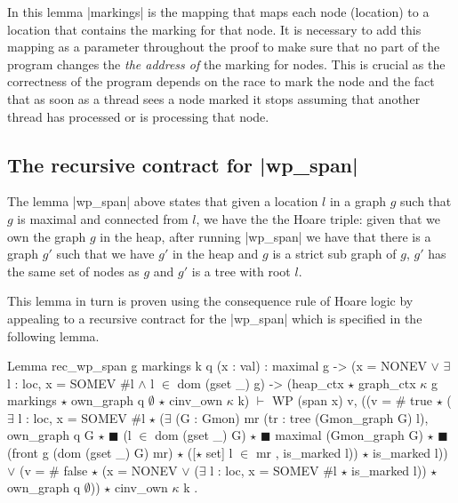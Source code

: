 \documentclass[]{scrartcl}
\begin{document}
In this lemma \Coqe|markings| is the mapping that maps each node (location) to a location that contains the marking for that node.
It is necessary to add this mapping as a parameter throughout the
proof to make sure that no part of the program changes the
\emph{the address of} the marking for nodes.
This is crucial as the correctness of the program depends on the
race to mark the node and the fact that as soon as a thread sees
a node marked it stops assuming that another thread has processed or is
processing that node.

\subsection{The recursive contract for \Coqe|wp_span|}
The lemma \Coqe|wp_span| above states that given a location $l$ in a graph $g$
such that $g$ is maximal and connected from $l$, we have the the Hoare triple:
given that we own the graph $g$ in the heap, after running \Coqe|wp_span| we have
that there is a graph $g'$ such that we have $g'$ in the heap and $g$ is a strict sub graph of $g$, $g'$ has the same set of nodes as $g$ and $g'$ is a tree with root $l$.

This lemma in turn is proven using the consequence rule of Hoare logic 
by appealing to a recursive contract for the \Coqe|wp_span| which is
specified in the following lemma.

\begin{Coq}
Lemma rec_wp_span g markings k q (x : val) :
    maximal g ->
    (x = NONEV $\lor$ $\exists$ l : loc,
        x = SOMEV $\#$l $\land$ l $\in$ dom (gset _) g) ->
    (heap_ctx $\star$ graph_ctx $\kappa$ g markings $\star$ own_graph q $\emptyset$ $\star$ cinv_own $\kappa$ k)
      $\vdash$
      WP (span x)
      {{ v, ((v = $\#$ true $\star$
             ($\exists$ l : loc, x = SOMEV $\#$l $\star$
               ($\exists$ (G : Gmon) mr (tr : tree (Gmon_graph G) l),
                  own_graph q G $\star$ $\scriptscriptstyle\blacksquare$ (l $\in$ dom (gset _) G) $\star$
                  $\scriptscriptstyle\blacksquare$ maximal (Gmon_graph G) $\star$
                  $\scriptscriptstyle\blacksquare$ (front g (dom (gset _) G) mr) $\star$
                   ([$\star$ set] l $\in$ mr , is_marked l)) $\star$ is_marked l)) $\lor$
             (v = $\#$ false $\star$
              (x = NONEV $\lor$ ($\exists$ l : loc, x = SOMEV $\#$l $\star$ is_marked l))
               $\star$ own_graph q $\emptyset$))
            $\star$ cinv_own $\kappa$ k }}.
\end{Coq}
\end{document}
